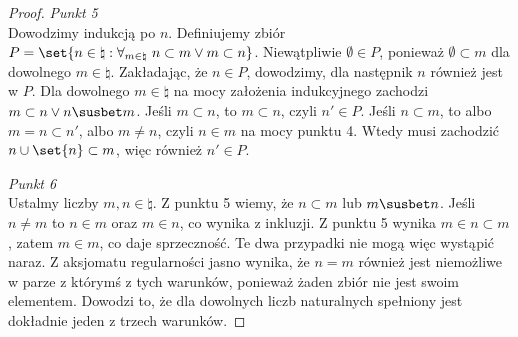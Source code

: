 \begin{proof}
    \textit{Punkt 5}\\
    Dowodzimy indukcją po \( n \). Definiujemy zbiór \( P = \set{n \in \natural : \forall_{m \in \natural} \ n \subset m \lor m \subset n} \).
    Niewątpliwie \( \emptyset \in P \), ponieważ \( \emptyset \subset m \) dla dowolnego \( m \in \natural \). Zakładając, że \( n \in P \), dowodzimy, dla następnik \( n \) również jest w \( P \).
    Dla dowolnego \( m \in \natural \) na mocy założenia indukcyjnego zachodzi \( m \subset n \lor n \susbet m \). Jeśli \( m \subset n \), to \( m \subset n \), czyli \( n' \in P \).
    Jeśli \( n \subset m \), to albo \( m = n \subset n' \), albo \( m \ne n \), czyli \( n \in m \) na mocy punktu 4. Wtedy musi zachodzić \( n \cup \set{n} \subset m \), więc również \( n' \in P \).

    \textit{Punkt 6}\\
    Ustalmy liczby \( m, n \in \natural \). Z punktu 5 wiemy, że \( n \subset m \) lub \( m \susbet n \). Jeśli \( n \ne m \) to \( n \in m \) oraz \( m \in n \), co wynika z inkluzji.
    Z punktu 5 wynika \( m \in n \subset m \), zatem \( m \in m \), co daje sprzeczność. Te dwa przypadki nie mogą więc wystąpić naraz. Z aksjomatu regularności jasno wynika, że \( n = m \) również jest niemożliwe w parze z którymś z tych warunków, ponieważ żaden zbiór nie jest swoim elementem.
    Dowodzi to, że dla dowolnych liczb naturalnych spełniony jest dokładnie jeden z trzech warunków.
\end{proof}